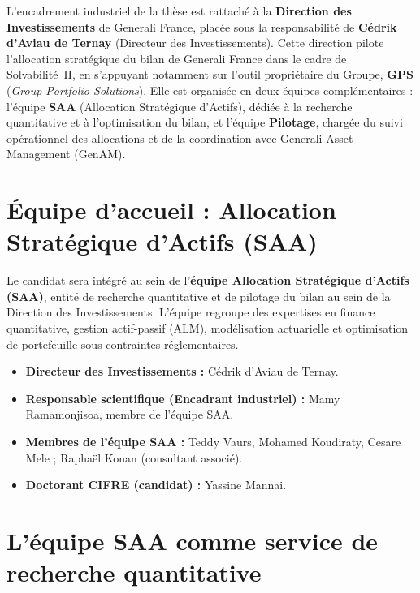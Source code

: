\documentclass[10pt,a4paper]{article}
\begin{document}
L'encadrement industriel de la thèse est rattaché à la \textbf{Direction des
Investissements} de Generali France, placée sous la responsabilité de
\textbf{Cédrik d'Aviau de Ternay} (Directeur des Investissements).  Cette
direction pilote l'allocation stratégique du bilan de Generali France dans le
cadre de Solvabilité~II, en s'appuyant notamment sur l'outil propriétaire du
Groupe, \textbf{GPS} (\textit{Group Portfolio Solutions}).
Elle est organisée en deux équipes complémentaires : l'équipe \textbf{SAA}
(Allocation Stratégique d'Actifs), dédiée à la recherche quantitative et à
l'optimisation du bilan, et l'équipe \textbf{Pilotage}, chargée du suivi
opérationnel des allocations et de la coordination avec Generali Asset
Management (GenAM).

\section{Équipe d'accueil : Allocation Stratégique d'Actifs (SAA)}

Le candidat sera intégré au sein de l'\textbf{équipe Allocation Stratégique
d'Actifs (SAA)}, entité de recherche quantitative et de pilotage du bilan au
sein de la Direction des Investissements.  L'équipe regroupe des expertises en
finance quantitative, gestion actif-passif (ALM), modélisation actuarielle et
optimisation de portefeuille sous contraintes réglementaires.

\begin{itemize}[leftmargin=1.6em,itemsep=1pt]
  \item \textbf{Directeur des Investissements :} Cédrik d'Aviau de Ternay.
  \item \textbf{Responsable scientifique (Encadrant industriel) :}
        Mamy Ramamonjisoa, membre de l'équipe SAA.
  \item \textbf{Membres de l'équipe SAA :}
        Teddy Vaurs, Mohamed Koudiraty, Cesare Mele ;
        Raphaël Konan (consultant associé).
  \item \textbf{Doctorant CIFRE (candidat) :} Yassine Mannai.
\end{itemize}

\section{L'équipe SAA comme service de recherche quantitative}
\end{document}

